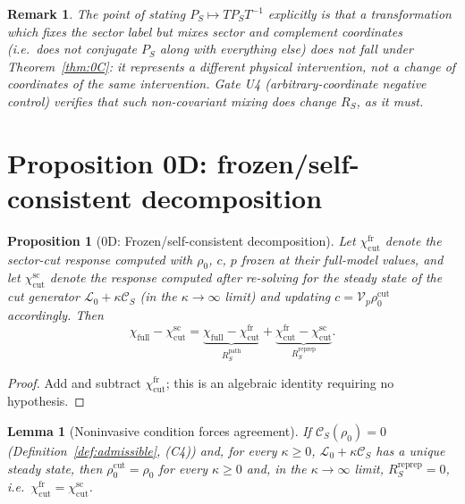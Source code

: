 \documentclass[11pt]{article}
\newtheorem{lemma}[theorem]{Lemma}
\newtheorem{proposition}[theorem]{Proposition}
\newtheorem{remark}[theorem]{Remark}
\begin{document}
\begin{remark}
The point of stating $P_S\mapsto TP_ST^{-1}$ explicitly is that a
transformation which fixes the sector \emph{label} but mixes sector and
complement coordinates (i.e.\ does not conjugate $P_S$ along with
everything else) does \emph{not} fall under Theorem~\ref{thm:0C}: it
represents a different physical intervention, not a change of coordinates
of the same intervention. Gate U4 (arbitrary-coordinate negative control)
verifies that such non-covariant mixing does change $R_S$, as it must.
\end{remark}

\section{Proposition 0D: frozen/self-consistent decomposition}

\begin{proposition}[0D: Frozen/self-consistent decomposition]
\label{prop:0D}
Let $\chi_{\mathrm{cut}}^{\mathrm{fr}}$ denote the sector-cut response
computed with $\rho_0$, $c$, $p$ frozen at their full-model values, and
let $\chi_{\mathrm{cut}}^{\mathrm{sc}}$ denote the response computed after
re-solving for the steady state of the cut generator
$\mathcal L_0+\kappa\mathcal C_S$ (in the $\kappa\to\infty$ limit) and
updating $c=\mathcal V_p\rho_0^{\mathrm{cut}}$ accordingly. Then
\[
\chi_{\mathrm{full}}-\chi_{\mathrm{cut}}^{\mathrm{sc}}
=\underbrace{\chi_{\mathrm{full}}-\chi_{\mathrm{cut}}^{\mathrm{fr}}}_{R_S^{\mathrm{path}}}
+\underbrace{\chi_{\mathrm{cut}}^{\mathrm{fr}}-\chi_{\mathrm{cut}}^{\mathrm{sc}}}_{R_S^{\mathrm{reprep}}}.
\]
\end{proposition}

\begin{proof}
Add and subtract $\chi_{\mathrm{cut}}^{\mathrm{fr}}$; this is an algebraic
identity requiring no hypothesis.
\end{proof}

\begin{lemma}[Noninvasive condition forces agreement]
\label{lem:0Dprime}
If $\mathcal C_S(\rho_0)=0$ (Definition~\ref{def:admissible}, (C4)) and,
for every $\kappa\ge0$, $\mathcal L_0+\kappa\mathcal C_S$ has a unique
steady state, then $\rho_0^{\mathrm{cut}}=\rho_0$ for every $\kappa\ge0$
and, in the $\kappa\to\infty$ limit, $R_S^{\mathrm{reprep}}=0$, i.e.\
$\chi_{\mathrm{cut}}^{\mathrm{fr}}=\chi_{\mathrm{cut}}^{\mathrm{sc}}$.
\end{lemma}
\end{document}
